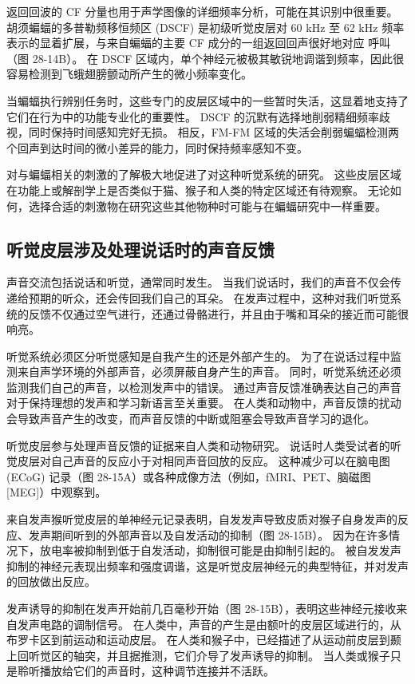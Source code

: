 返回回波的 CF 分量也用于声学图像的详细频率分析，可能在其识别中很重要。 胡须蝙蝠的多普勒频移恒频区 (DSCF) 是初级听觉皮层对 60 kHz 至 62 kHz 频率表示的显着扩展，与来自蝙蝠的主要 CF 成分的一组返回回声很好地对应 呼叫（图 28-14B）。 在 DSCF 区域内，单个神经元被极其敏锐地调谐到频率，因此很容易检测到飞蛾翅膀颤动所产生的微小频率变化。

当蝙蝠执行辨别任务时，这些专门的皮层区域中的一些暂时失活，这显着地支持了它们在行为中的功能专业化的重要性。 DSCF 的沉默有选择地削弱精细频率歧视，同时保持时间感知完好无损。 相反，FM-FM 区域的失活会削弱蝙蝠检测两个回声到达时间的微小差异的能力，同时保持频率感知不变。

对与蝙蝠相关的刺激的了解极大地促进了对这种听觉系统的研究。 这些皮层区域在功能上或解剖学上是否类似于猫、猴子和人类的特定区域还有待观察。 无论如何，选择合适的刺激物在研究这些其他物种时可能与在蝙蝠研究中一样重要。

\subsection{听觉皮层涉及处理说话时的声音反馈}
声音交流包括说话和听觉，通常同时发生。 当我们说话时，我们的声音不仅会传递给预期的听众，还会传回我们自己的耳朵。 在发声过程中，这种对我们听觉系统的反馈不仅通过空气进行，还通过骨骼进行，并且由于嘴和耳朵的接近而可能很响亮。

听觉系统必须区分听觉感知是自我产生的还是外部产生的。 为了在说话过程中监测来自声学环境的外部声音，必须屏蔽自身产生的声音。 同时，听觉系统还必须监测我们自己的声音，以检测发声中的错误。 通过声音反馈准确表达自己的声音对于保持理想的发声和学习新语言至关重要。 在人类和动物中，声音反馈的扰动会导致声音产生的改变，而声音反馈的中断或阻塞会导致声音学习的退化。

听觉皮层参与处理声音反馈的证据来自人类和动物研究。 说话时人类受试者的听觉皮层对自己声音的反应小于对相同声音回放的反应。 这种减少可以在脑电图 (ECoG) 记录（图 28-15A）或各种成像方法（例如，fMRI、PET、脑磁图 [MEG]）中观察到。

来自发声猴听觉皮层的单神经元记录表明，自发发声导致皮质对猴子自身发声的反应、发声期间听到的外部声音以及自发活动的抑制（图 28-15B）。 因为在许多情况下，放电率被抑制到低于自发活动，抑制很可能是由抑制引起的。 被自发发声抑制的神经元表现出频率和强度调谐，这是听觉皮层神经元的典型特征，并对发声的回放做出反应。

发声诱导的抑制在发声开始前几百毫秒开始（图 28-15B），表明这些神经元接收来自发声电路的调制信号。 在人类中，声音的产生是由额叶的皮层区域进行的，从布罗卡区到前运动和运动皮层。 在人类和猴子中，已经描述了从运动前皮层到颞上回听觉区的轴突，并且据推测，它们介导了发声诱导的抑制。 当人类或猴子只是聆听播放给它们的声音时，这种调节连接并不活跃。

